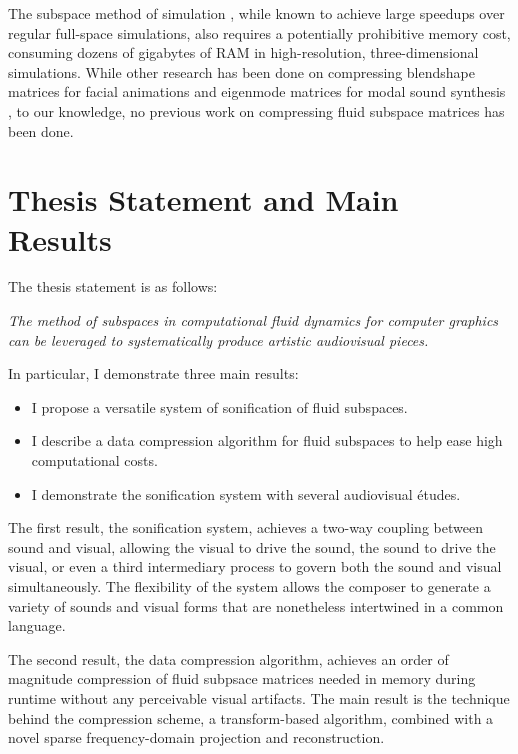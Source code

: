 The subspace method of simulation \cite{Pentland:1989:GVM}, while known to achieve large speedups over regular full-space simulations, also requires a potentially prohibitive memory cost, consuming dozens of gigabytes of RAM 
in high-resolution, three-dimensional simulations. While other research has been done on compressing blendshape matrices for facial animations \cite{Seo:2011:CDM} and eigenmode matrices for modal sound synthesis \cite{Langlois:2014:ECM},
to our knowledge, no previous work on compressing fluid subspace matrices has been done.

\section{Thesis Statement and Main Results}
The thesis statement is as follows:

\begin{addmargin}[1em]{2em}
{\em The method of subspaces in computational fluid dynamics for computer graphics can be leveraged to systematically produce artistic audiovisual pieces.}
\end{addmargin}
In particular, I demonstrate three main results:

\begin{itemize}
	\item I propose a versatile system of sonification of fluid subspaces.
	\item I describe a data compression algorithm for fluid subspaces to help ease high computational costs.
	\item I demonstrate the sonification system with several audiovisual {\'e}tudes.
\end{itemize}

The first result, the sonification system, achieves a two-way coupling between sound and visual, allowing the visual to drive the sound, the sound to drive the visual, or even a third intermediary process to govern both the sound and visual simultaneously. The flexibility of the system allows the composer to generate a variety of sounds and visual forms that are nonetheless intertwined in a common language. 

The second result, the data compression algorithm, achieves an order of magnitude compression of fluid subpsace matrices needed in memory during runtime without any perceivable visual artifacts. The main result is the technique behind the compression scheme, a transform-based algorithm, combined with a novel sparse frequency-domain projection and reconstruction.

